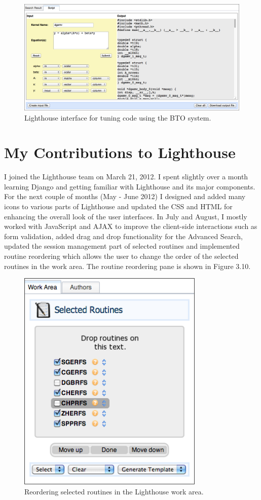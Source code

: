 \begin{figure}[h!]\label{bto}
  \centering
  \includegraphics[width=6in]{figs/bto}
  \caption[Build to Order BLAS system]
   {Lighthouse interface for tuning code using the BTO system.}
\end{figure}

\section{My Contributions to Lighthouse}
I joined the Lighthouse team on March 21, 2012. I spent slightly over a month learning Django and getting familiar with Lighthouse and its major components. For the next couple of months (May - June 2012) I designed and added many icons to various parts of Lighthouse and updated the CSS and HTML for enhancing the overall look of the user interfaces. In July and August, I mostly worked with JavaScript and AJAX to improve the client-side interactions such as form validation, added drag and drop functionality for the Advanced Search, updated the session management part of selected routines and implemented routine reordering which allows the user to change the order of the selected routines in the work area. The routine reordering pane is shown in Figure 3.10.

\begin{figure}[h!]\label{routineordering}
  \centering
  \includegraphics[width=3.5in]{figs/routineordering}
  \caption[Reordering routines]
   {Reordering selected routines in the Lighthouse work area.}
\end{figure}

